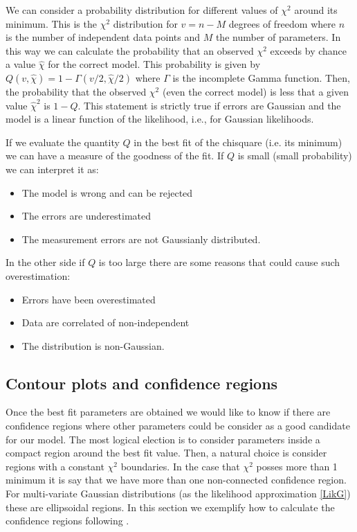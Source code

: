 \documentclass[onecolumn,           %
               showpacs,            %
               preprintnumbers,     %
               aps,                 %
               prl,          	    %
               letterpaper,             %
               superscriptaddress,      %
               nofootinbib,         %
               tightenlines,        %
               floats,floatfix      %
               ,usenatbib,
               ]{revtex4-1}
\begin{document}
We can consider a probability distribution for different values of $\chi^2$ around its minimum. This is the $\chi^2$ distribution for $v=n-M$ degrees of freedom where $n$ is the number of independent data points and $M$ the number of parameters. In this way we can calculate the probability that an observed $\chi^2$ exceeds by chance a value $\hat \chi$ for the correct model. This probability is given by \cite{NR} $Q(v,\hat\chi)=1-\Gamma(v/2,\hat\chi/2)$ where $\Gamma$ is the incomplete Gamma function. Then, the probability that the observed $\chi^2$ (even the correct model) is less that a given value $\hat\chi^2$ is $1-Q$. This statement is strictly true if errors are Gaussian and the model is a linear function of the likelihood, i.e., for Gaussian likelihoods.

If we evaluate the quantity $Q$ in the best fit of the chisquare (i.e. its minimum) we can have a measure of the goodness of the fit. If $Q$ is small (small probability) we can interpret it as:
\begin{itemize}
\item The model is wrong and can be rejected
\item The errors are underestimated 
\item The measurement errors are not Gaussianly distributed.
\end{itemize}
In the other side if $Q$ is too large there are some reasons that could cause such overestimation:
\begin{itemize}
\item Errors have been overestimated
\item Data are correlated of non-independent
\item The distribution is non-Gaussian.
\end{itemize}
\subsection{Contour plots and confidence regions}

Once the best fit parameters are obtained we would like to know if there are confidence regions where other parameters could be consider as a good candidate for our model. The most logical election is to consider parameters inside a compact region around the best fit value. Then, a natural choice is consider regions with a constant $\chi^2$ boundaries. In the case that $\chi^2$ posses more than 1 minimum it is say that we have more than one non-connected confidence region. For multi-variate Gaussian distributions (as the likelihood approximation \eqref{LikG}) these are ellipsoidal regions. In this section we exemplify how to calculate the confidence regions following \cite{LiV}. 
\end{document}
